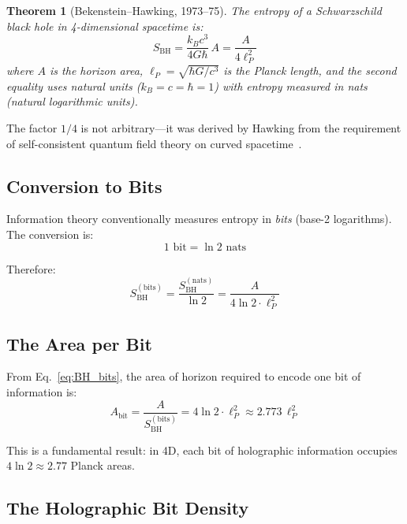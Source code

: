 \documentclass[11pt,a4paper]{article}
\theoremstyle{plain}
\newtheorem{theorem}{Theorem}[section]
\theoremstyle{definition}
\newcommand{\lp}{\ell_P}
\begin{document}
\begin{theorem}[Bekenstein--Hawking, 1973--75]
The entropy of a Schwarzschild black hole in 4-dimensional spacetime is:
\begin{equation}
S_{\text{BH}} = \frac{k_B c^3}{4G\hbar} \, A = \frac{A}{4\lp^2}
\label{eq:BH_entropy}
\end{equation}
where $A$ is the horizon area, $\lp = \sqrt{\hbar G/c^3}$ is the Planck length, and the second equality uses natural units ($k_B = c = \hbar = 1$) with entropy measured in \emph{nats} (natural logarithmic units).
\end{theorem}

The factor $1/4$ is not arbitrary---it was derived by Hawking from the requirement of self-consistent quantum field theory on curved spacetime~\cite{Hawking1975}.

\subsection{Conversion to Bits}

Information theory conventionally measures entropy in \emph{bits} (base-2 logarithms). The conversion is:
\begin{equation}
1 \text{ bit} = \ln 2 \text{ nats}
\end{equation}

Therefore:
\begin{equation}
S_{\text{BH}}^{(\text{bits})} = \frac{S_{\text{BH}}^{(\text{nats})}}{\ln 2} = \frac{A}{4 \ln 2 \cdot \lp^2}
\label{eq:BH_bits}
\end{equation}

\subsection{The Area per Bit}

From Eq.~\eqref{eq:BH_bits}, the area of horizon required to encode one bit of information is:
\begin{equation}
A_{\text{bit}} = \frac{A}{S_{\text{BH}}^{(\text{bits})}} = 4\ln 2 \cdot \lp^2 \approx 2.773 \, \lp^2
\label{eq:area_per_bit}
\end{equation}

This is a fundamental result: in 4D, each bit of holographic information occupies $4\ln 2 \approx 2.77$ Planck areas.

\subsection{The Holographic Bit Density}
\end{document}
